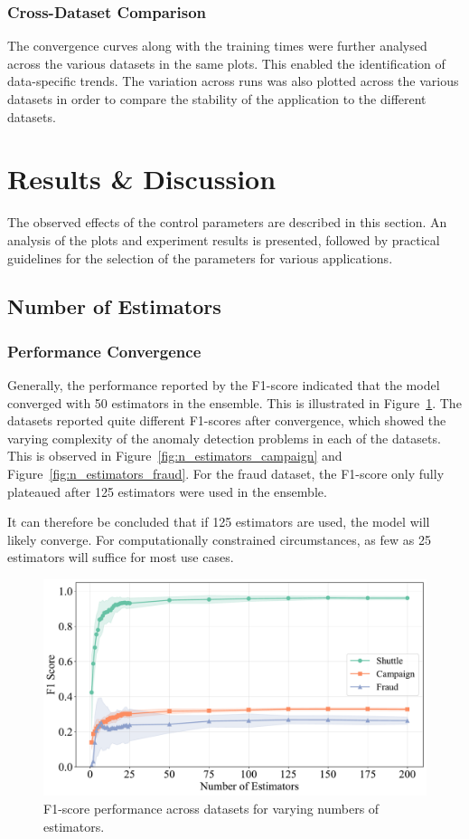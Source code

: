 \documentclass[10pt, conference]{IEEEtran}
\begin{document}
\subsubsection{Cross-Dataset Comparison}
The convergence curves along with the training times were further analysed across the various datasets in the same plots. This enabled the identification of data-specific trends. The variation across runs was also plotted across the various datasets in order to compare the stability of the application to the different datasets.





\section{Results \& Discussion}
The observed effects of the control parameters are described in this section. An analysis of the plots and experiment results is presented, followed by practical guidelines for the selection of the parameters for various applications.
\subsection{Number of Estimators}
\subsubsection{Performance Convergence}
Generally, the performance reported by the F1-score indicated that the model converged with 50 estimators in the ensemble. This is illustrated in Figure~\ref{fig:n_estimators_f1}. The  datasets reported quite different F1-scores after convergence, which showed the varying complexity of the anomaly detection problems in each of the datasets. This is observed in Figure~\ref{fig:n_estimators_campaign} and Figure~\ref{fig:n_estimators_fraud}. For the fraud dataset, the F1-score only fully plateaued after 125 estimators were used in the ensemble. 

It can therefore be concluded that if 125 estimators are used, the model will likely converge. For computationally constrained circumstances, as few as 25 estimators will suffice for most use cases.
\begin{figure}[H]
	\centering
	\includegraphics[width=0.95\linewidth]{../results/multi_dataset/n_estimators_f1.pdf}
	\caption{F1-score performance across datasets for varying numbers of estimators.}
	\label{fig:n_estimators_f1}
\end{figure}
\end{document}
